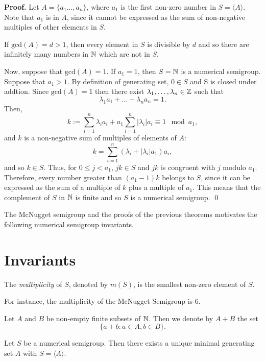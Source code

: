 \textbf{Proof. } Let $A = \{a_{1} \ldots, a_{n}\}$, where $a_1$ is the first non-zero number in $S = \langle A \rangle$. Note that $a_1$ is in $A$, since it cannot be expressed as the sum of non-negative multiples of other elements in $S$. \par
If $\text{gcd}(A) = d > 1$, then every element in $S$ is divisible by $d$ and so there are infinitely many numbers in $\mathbb{N}$ which are not in $S$. \par
Now, suppose that $\text{gcd}(A) = 1$. If $a_1 = 1$, then $S = \mathbb{N}$ is a numerical semigroup. Suppose that $a_1 > 1$. By definition of generating set, $0 \in S$ and S is closed under addtion. Since $\text{gcd}(A) = 1$ then there exist $\lambda_1, \ldots, \lambda_n \in \mathbb{Z}$ such that 
\[\lambda_1a_1 + \ldots + \lambda_na_n = 1.\]
Then, 
\[
    k := \sum_{i = 1}^n \lambda_ia_i + a_1\sum_{i = 1}^n|\lambda_i|a_i \equiv 1 \mod a_1,
\]
and $k$ is a non-negative sum of multiples of elements of $A$: 
\[k = \sum_{i = 1}^n (\lambda_i + |\lambda_i|a_1)a_i,\]
and so $k \in S$. Thus, for $0 \leq j < a_1$, $jk \in S$ and $jk$ is congruent with $j$ modulo $a_1$. Therefore, every number greater than $(a_1 - 1)k$ belongs to $S$, since it can be expressed as the sum of a multiple of $k$ plus a multiple of $a_1$.  This means that the complement of $S$ in $\mathbb{N}$ is finite and so $S$ is a numerical semigroup. \qed \par

The McNugget semigroup and the proofs of the previous theorems motivates the following numerical semigroup invariants. \par 

\section{Invariants}\label{sec:smgps:invariants}

\begin{definition}\label{def:smgps:multiplicity}
    The \textit{multiplicity} of $S$, denoted by $m(S)$, is the smallest non-zero element of $S$.
\end{definition}

For instance, the multiplicity of the McNugget Semigroup is 6. \par

Let $A$ and $B$ be non-empty finite subsets of $\mathbb{N}$. Then we denote by $A + B$ the set \[\{a + b : a \in A, b \in B\}.\] 

\begin{theorem}\label{thm:smgps:minimal_generating_set}
    Let $S$ be a numerical semigroup. Then there exists a unique minimal generating set $A$ with $S = \langle A \rangle$.
\end{theorem}

